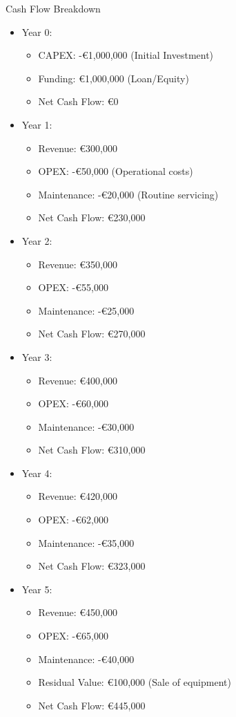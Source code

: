 \begin{frame}[allowframebreaks]{Cash Flow Breakdown}
  \begin{itemize}
    \item Year 0:
      \begin{itemize}
        \item CAPEX: -€1,000,000 (Initial Investment)
        \item Funding: €1,000,000 (Loan/Equity)
        \item Net Cash Flow: €0
      \end{itemize}
    \item Year 1:
      \begin{itemize}
        \item Revenue: €300,000
        \item OPEX: -€50,000 (Operational costs)
        \item Maintenance: -€20,000 (Routine servicing)
        \item Net Cash Flow: €230,000
      \end{itemize}
    \item Year 2:
      \begin{itemize}
        \item Revenue: €350,000
        \item OPEX: -€55,000
        \item Maintenance: -€25,000
        \item Net Cash Flow: €270,000
      \end{itemize}
    \item Year 3:
      \begin{itemize}
        \item Revenue: €400,000
        \item OPEX: -€60,000
        \item Maintenance: -€30,000
        \item Net Cash Flow: €310,000
      \end{itemize}
    \item Year 4:
      \begin{itemize}
        \item Revenue: €420,000
        \item OPEX: -€62,000
        \item Maintenance: -€35,000
        \item Net Cash Flow: €323,000
      \end{itemize}
      \item Year 5:
      \begin{itemize}
        \item Revenue: €450,000
        \item OPEX: -€65,000
        \item Maintenance: -€40,000
        \item Residual Value: €100,000 (Sale of equipment)
        \item Net Cash Flow: €445,000
      \end{itemize}
  \end{itemize}
\end{frame}

